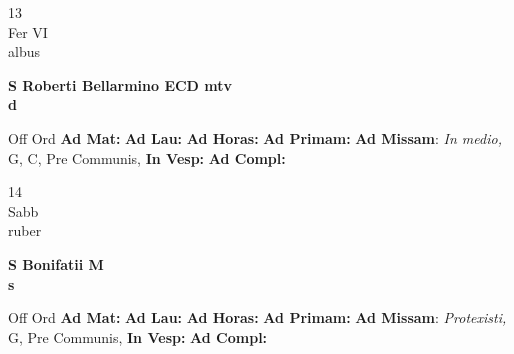 \documentclass[10pt, openany]{book}
\begin{document}
    \begin{center}
        \begin{minipage}{3.5in}
            \vspace{2em}
            \begin{minipage}{0.5in}
                {\Huge 13} \\
                {\normalsize Fer VI} \\
                {\normalsize albus}
            \end{minipage}
            \begin{minipage}{3.0in}
                \textbf{ \large S Roberti Bellarmino ECD mtv \\
                \textnormal{\normalsize d}} \\ 
            \end{minipage}
            \begin{justify}Off Ord
                \textbf{Ad Mat: }
                \textbf{Ad Lau: }
                \textbf{Ad Horas: }
                \textbf{Ad Primam: }\textbf{Ad Missam}: \textit{In medio,} G, C, Pre Communis,  
                \textbf{In Vesp: }
                \textbf{Ad Compl: }
            \end{justify}
        \end{minipage}
    \end{center}

    \begin{center}
        \begin{minipage}{3.5in}
            \vspace{2em}
            \begin{minipage}{0.5in}
                {\Huge 14} \\
                {\normalsize Sabb} \\
                {\normalsize ruber}
            \end{minipage}
            \begin{minipage}{3.0in}
                \textbf{ \large S Bonifatii M \\
                \textnormal{\normalsize s}} \\ 
            \end{minipage}
            \begin{justify}Off Ord
                \textbf{Ad Mat: }
                \textbf{Ad Lau: }
                \textbf{Ad Horas: }
                \textbf{Ad Primam: }\textbf{Ad Missam}: \textit{Protexisti,} G, Pre Communis,  
                \textbf{In Vesp: }
                \textbf{Ad Compl: }
            \end{justify}
        \end{minipage}
    \end{center}
\end{document}

